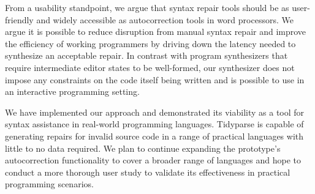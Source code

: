 \documentclass[runningheads]{llncs}
\begin{document}
From a usability standpoint, we argue that syntax repair tools should be as user-friendly and widely accessible as autocorrection tools in word processors. We argue it is possible to reduce disruption from manual syntax repair and improve the efficiency of working programmers by driving down the latency needed to synthesize an acceptable repair. In contrast with program synthesizers that require intermediate editor states to be well-formed, our synthesizer does not impose any constraints on the code itself being written and is possible to use in an interactive programming setting.

We have implemented our approach and demonstrated its viability as a tool for syntax assistance in real-world programming languages. Tidyparse is capable of generating repairs for invalid source code in a range of practical languages with little to no data required. We plan to continue expanding the prototype's autocorrection functionality to cover a broader range of languages and hope to conduct a more thorough user study to validate its effectiveness in practical programming scenarios.


\clearpage
\end{document}
